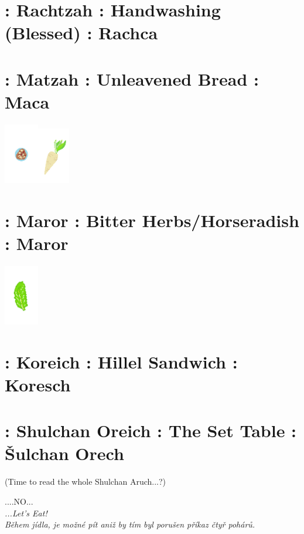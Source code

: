 \documentclass[a5paper,10pt]{memoir}
\begin{document}
\section{ : Rachtzah : Handwashing (Blessed) : Rachca}
\NetilatYadayim 

\section{ : Matzah : Unleavened Bread : Maca}
\HaMotzi
\Matzah
\vspace*{-4ex}
\hfill\includegraphics[width=15mm]{Charoset}\includegraphics[width=14mm]{Maror}
\vspace*{-12ex}  %
\section{ : Maror : Bitter Herbs/Horseradish : Maror}
\Maror

\vspace*{-2ex}
\hfill\includegraphics[width=15mm]{Chazeret}
\vspace*{-12ex}  %
\section{ : Koreich : Hillel Sandwich : Koresch}
\Koreich

\section{ : Shulchan Oreich : The Set Table : Šulchan Orech}
\color{midblue} (Time to read the whole Shulchan Aruch...?)\\
\begin{center}
	\vspace*{-4ex}
	....NO... \vspace*{1ex} \\ \hspace*{15mm} \textit{ ...Let's Eat! \\ \color{black} Během jídla, je možné  pít aniž by tím byl porušen příkaz čtyř pohárů.}
	\end{center}
\end{document}
